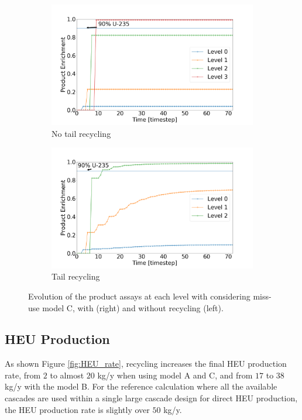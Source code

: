 \begin{figure}[h!]
    \centering
    \begin{subfigure}[t]{0.45\textwidth}
        \centering
        \includegraphics[scale=0.18]{NR_case3}
        \caption{No tail recycling}
        \label{sfig:case3_NR}
    \end{subfigure}%
    \begin{subfigure}[t]{0.45\textwidth}
        \centering
        \includegraphics[scale=0.18]{R_case3}
        \caption{Tail recycling}
        \label{sfig:case3_R}
    \end{subfigure}
    \caption{Evolution of the product assays at each level with considering
    miss-use model C, with (right) and without recycling (left).}
    \label{fig:case3}
\end{figure}



\subsection{\gls{HEU} Production}
As shown Figure \ref{fig:HEU_rate}, recycling increases the final \gls{HEU}
production rate, from $2$ to almost $20$ kg/y when using model A and C, and from
$17$ to $38$ kg/y with the model B. For the reference calculation where all the
available cascades are used within a single large cascade design for direct
\gls{HEU} production, the \gls{HEU} production rate is slightly over $50$ kg/y.


